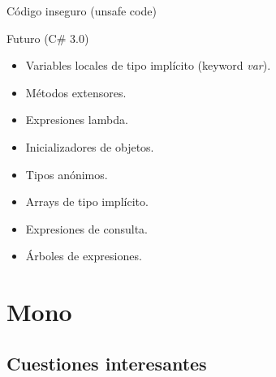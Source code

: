 \documentclass{beamer}
\begin{document}
\begin{frame}
  \begin{exampleblock}{Código inseguro (unsafe code)}
    \begin{scriptsize}
      
    \end{scriptsize}
  \end{exampleblock}
\end{frame}

\begin{frame}{Futuro (C\# 3.0)}
  \begin{itemize}
    \item Variables locales de tipo implícito (keyword \emph{var}).
    \item Métodos extensores.
    \item Expresiones lambda.
    \item Inicializadores de objetos.
    \item Tipos anónimos.
    \item Arrays de tipo implícito.
    \item Expresiones de consulta.
    \item Árboles de expresiones.
  \end{itemize}
\end{frame}


\section{Mono}

\subsection{Cuestiones interesantes}
\end{document}
